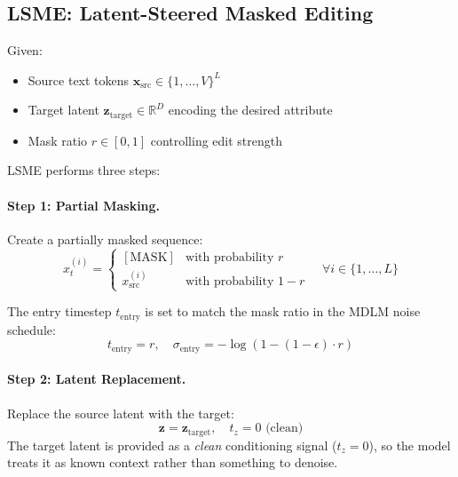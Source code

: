 \documentclass{article}
\begin{document}
\subsection{LSME: Latent-Steered Masked Editing}

Given:
\begin{itemize}
    \item Source text tokens $\mathbf{x}_\text{src} \in \{1, \ldots, V\}^L$
    \item Target latent $\mathbf{z}_\text{target} \in \mathbb{R}^D$ encoding the desired attribute
    \item Mask ratio $r \in [0, 1]$ controlling edit strength
\end{itemize}

LSME performs three steps:

\paragraph{Step 1: Partial Masking.}
Create a partially masked sequence:
\begin{equation}
    x_t^{(i)} = \begin{cases}
        [\text{MASK}] & \text{with probability } r \\
        x_\text{src}^{(i)} & \text{with probability } 1 - r
    \end{cases}
    \quad \forall i \in \{1, \ldots, L\}
\end{equation}

The entry timestep $t_\text{entry}$ is set to match the mask ratio in the MDLM noise schedule:
\begin{equation}
    t_\text{entry} = r, \quad \sigma_\text{entry} = -\log(1 - (1-\epsilon) \cdot r)
\end{equation}

\paragraph{Step 2: Latent Replacement.}
Replace the source latent with the target:
\begin{equation}
    \mathbf{z} = \mathbf{z}_\text{target}, \quad t_z = 0 \text{ (clean)}
\end{equation}
The target latent is provided as a \emph{clean} conditioning signal ($t_z = 0$), so the model treats it as known context rather than something to denoise.
\end{document}
